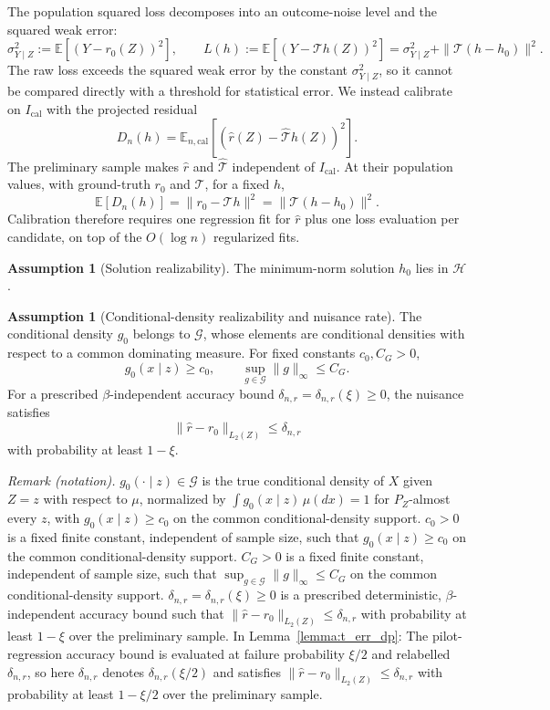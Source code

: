 \documentclass[12pt]{article}
\theoremstyle{plain}
\theoremstyle{definition}
\newtheorem{assumption}[theorem]{Assumption}
\theoremstyle{remark}
\begin{document}
The population squared loss decomposes into an outcome-noise level and the squared weak error:
\[
\sigma^2_{Y\mid Z}:=\mathbb E[(Y-r_0(Z))^2],
\qquad
L(h):=\mathbb E[(Y-\mathcal T h(Z))^2]
=\sigma^2_{Y\mid Z}+\|\mathcal T(h-h_0)\|^2.
\]
The raw loss exceeds the squared weak error by the constant $\sigma^2_{Y\mid Z}$, so it cannot be compared directly with a threshold for statistical error. We instead calibrate on $I_{\mathrm{cal}}$ with the projected residual
\begin{equation}\label{eq:rdiv_projected_loss}
D_n(h)=\mathbb E_{n,\mathrm{cal}} [(\hat r(Z)-\hat{\mathcal T}h(Z))^2].
\end{equation}
The preliminary sample makes $\hat r$ and $\hat{\mathcal T}$ independent of $I_{\mathrm{cal}}$. At their population values, with ground-truth $r_0$ and $\mathcal T$, for a fixed $h$,
\[
\mathbb E[D_n(h)]=\|r_0-\mathcal T h\|^2=\|\mathcal T(h-h_0)\|^2.
\]
Calibration therefore requires one regression fit for $\hat r$ plus one loss evaluation per candidate, on top of the $O(\log n)$ regularized fits.

\begin{assumption}[Solution realizability]\label{asp:closeness_deepiv}
The minimum-norm solution $h_0$ lies in $\mathcal H$.
\end{assumption}

\begin{assumption}[Conditional-density realizability and nuisance rate]\label{asp:re_cd}
The conditional density $g_0$ belongs to $\mathcal G$, whose elements are conditional densities with respect to a common dominating measure. For fixed constants $c_0,C_G>0$,
\[
g_0(x\mid z)\geqslant c_0, \qquad \sup_{g\in\mathcal G}\|g\|_\infty\leqslant C_G.
\]
For a prescribed $\beta$-independent accuracy bound $\delta_{n,r}=\delta_{n,r}(\xi)\geqslant0$, the nuisance satisfies
\[
\|\hat r-r_0\|_{L_2(Z)}\leqslant \delta_{n,r}
\]
with probability at least $1-\xi$.
\end{assumption}

\noindent\textit{Remark (notation).} $g_0(\cdot\mid z)\in\mathcal G$ is the true conditional density of $X$ given $Z=z$ with respect to $\mu$, normalized by $\int g_0(x\mid z)\,\mu(dx)=1$ for $P_Z$-almost every $z$, with $g_0(x\mid z)\geqslant c_0$ on the common conditional-density support. $c_0>0$ is a fixed finite constant, independent of sample size, such that $g_0(x\mid z)\geqslant c_0$ on the common conditional-density support. $C_G>0$ is a fixed finite constant, independent of sample size, such that $\sup_{g\in\mathcal G}\|g\|_\infty\leqslant C_G$ on the common conditional-density support. $\delta_{n,r}=\delta_{n,r}(\xi)\geqslant0$ is a prescribed deterministic, $\beta$-independent accuracy bound such that $\|\hat r-r_0\|_{L_2(Z)}\leqslant\delta_{n,r}$ with probability at least $1-\xi$ over the preliminary sample. In Lemma~\ref{lemma:t_err_dp}: The pilot-regression accuracy bound is evaluated at failure probability $\xi/2$ and relabelled $\delta_{n,r}$, so here $\delta_{n,r}$ denotes $\delta_{n,r}(\xi/2)$ and satisfies $\|\hat r-r_0\|_{L_2(Z)}\leqslant\delta_{n,r}$ with probability at least $1-\xi/2$ over the preliminary sample.
\end{document}

